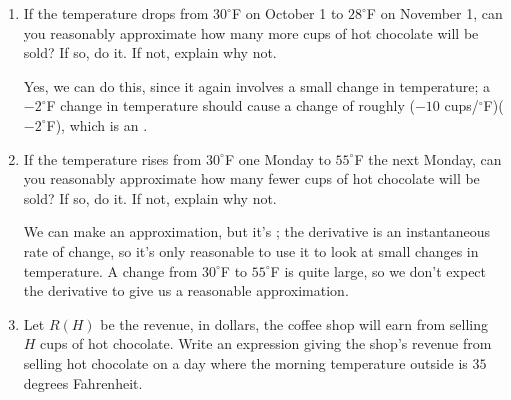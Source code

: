 \documentclass{article}
\theoremstyle{theorem}
\begin{document}
\begin{enumerate}
\begin{enumerate}[resume]
    \begin{solution}
      Yes, we can do this; knowing that $C'(30) = -10$ means that, when the temperature is $30^\circ$F, the number of cups of hot chocolate sold changes by approximately $-10$ cups per $^\circ$F change in the temperature (for small changes in the temperature). So, when the temperature increases by $1^\circ$F from $30^\circ$, we expect the number of cups of hot chocolate sold to .
    \end{solution}

  \item
    \begin{problem}[\vfill]
      If the temperature drops from $30^\circ$F on October 1 to $28^\circ$F on November 1, can you reasonably approximate how many more cups of hot chocolate will be sold? If so, do it. If not, explain why not.
    \end{problem}

    \begin{solution}
      Yes, we can do this, since it again involves a small change in temperature; a $-2^\circ$F change in temperature should cause a change of roughly ($-10$ cups/$^\circ$F)($-2^\circ$F), which is an .
    \end{solution}

  \item
    \begin{problem}[\vfill]
      If the temperature rises from $30^\circ$F one Monday to $55^\circ$F the next Monday, can you reasonably approximate how many fewer cups of hot chocolate will be sold? If so, do it. If not, explain why not.
    \end{problem}

    \begin{solution}
      We can make an approximation, but it's ; the derivative is an instantaneous rate of change, so it's only reasonable to use it to look at small changes in temperature. A change from $30^\circ$F to $55^\circ$F is quite large, so we don't expect the derivative to give us a reasonable approximation.
    \end{solution}

  \item

    \begin{problem}[\nstretch{0.25}]
      Let $R(H)$ be the revenue, in dollars, the coffee shop will earn from selling $H$ cups of hot chocolate. Write an expression giving the shop's revenue from selling hot chocolate on a day where the morning temperature outside is $35$ degrees Fahrenheit.
    \end{problem}


\end{enumerate}
\end{enumerate}
\end{document}
